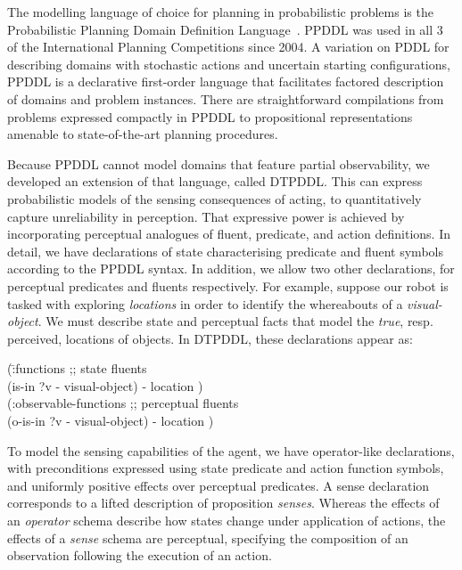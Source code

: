 
The modelling language of choice for planning in probabilistic
problems is the Probabilistic Planning Domain Definition
Language~\cite{younes:littman:04,younes:etal:2005}. PPDDL was used in
all 3 of the International Planning Competitions since 2004. A
variation on PDDL for describing domains with stochastic actions and
uncertain starting configurations, PPDDL is a declarative first-order
language that facilitates factored description of domains and problem
instances. There are straightforward compilations from problems
expressed compactly in PPDDL to propositional representations amenable
to state-of-the-art planning procedures.

Because PPDDL cannot model domains that feature partial observability,
we developed an extension of that language, called DTPDDL. This can
express probabilistic models of the sensing consequences of acting, to
quantitatively capture unreliability in perception. That expressive
power is achieved by incorporating perceptual analogues of fluent,
predicate, and action definitions. In detail, we have declarations of
state characterising predicate and fluent symbols according to the
PPDDL syntax. In addition, we allow two other declarations, for
perceptual predicates and fluents respectively. For example, suppose
our robot is tasked with exploring {\em locations} in order to
identify the whereabouts of a {\em visual-object}. We must describe
state and perceptual facts that model the {\em true}, resp. perceived,
locations of objects. In DTPDDL, these declarations appear as:

\small
\begin{tabtt}
(\=:functions  ;; state fluents\\
  \> (is-in ?v - visual-object) - location )\\
(:observable-functions  ;; perceptual fluents\\
  \> (o-is-in ?v - visual-object) - location )
\end{tabtt}
\normalsize

\noindent To model the sensing capabilities of the agent, we have
operator-like declarations, with preconditions expressed using state
predicate and action function symbols, and uniformly positive effects
over perceptual predicates. A sense declaration corresponds to a
lifted description of proposition {\em senses}. Whereas the effects of
an {\em operator} schema describe how states change under application
of actions, the effects of a {\em sense} schema are perceptual,
specifying the composition of an observation following the execution
of an action. 

